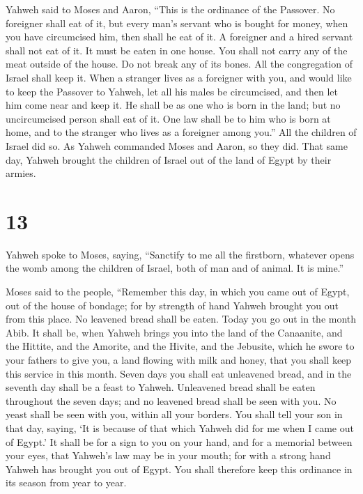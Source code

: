  Yahweh said to Moses and Aaron, ``This is the ordinance
of the Passover. No foreigner shall eat of it,  but every
man's servant who is bought for money, when you have circumcised him,
then shall he eat of it.  A foreigner and a hired servant
shall not eat of it.  It must be eaten in one house. You
shall not carry any of the meat outside of the house. Do not break any
of its bones.  All the congregation of Israel shall keep
it.  When a stranger lives as a foreigner with you, and
would like to keep the Passover to Yahweh, let all his males be
circumcised, and then let him come near and keep it. He shall be as one
who is born in the land; but no uncircumcised person shall eat of it.
 One law shall be to him who is born at home, and to the
stranger who lives as a foreigner among you.''  All the
children of Israel did so. As Yahweh commanded Moses and Aaron, so they
did.  That same day, Yahweh brought the children of
Israel out of the land of Egypt by their armies.

\hypertarget{section-12}{%
\section{13}\label{section-12}}

 Yahweh spoke to Moses, saying,  ``Sanctify
to me all the firstborn, whatever opens the womb among the children of
Israel, both of man and of animal. It is mine.''

 Moses said to the people, ``Remember this day, in which
you came out of Egypt, out of the house of bondage; for by strength of
hand Yahweh brought you out from this place. No leavened bread shall be
eaten.  Today you go out in the month Abib. 
It shall be, when Yahweh brings you into the land of the Canaanite, and
the Hittite, and the Amorite, and the Hivite, and the Jebusite, which he
swore to your fathers to give you, a land flowing with milk and honey,
that you shall keep this service in this month.  Seven
days you shall eat unleavened bread, and in the seventh day shall be a
feast to Yahweh.  Unleavened bread shall be eaten
throughout the seven days; and no leavened bread shall be seen with you.
No yeast shall be seen with you, within all your borders. 
You shall tell your son in that day, saying, `It is because of that
which Yahweh did for me when I came out of Egypt.'  It
shall be for a sign to you on your hand, and for a memorial between your
eyes, that Yahweh's law may be in your mouth; for with a strong hand
Yahweh has brought you out of Egypt.  You shall therefore
keep this ordinance in its season from year to year.

